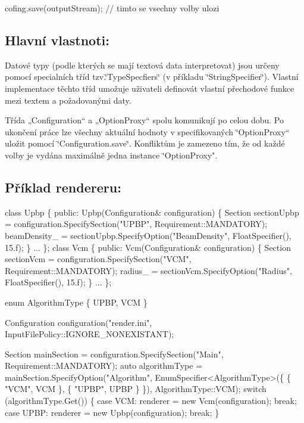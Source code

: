 \begin{DoxyPre}{\ttfamily cofing.save(outputStream); // timto se vsechny volby ulozi
}\end{DoxyPre}
 



\subsection*{Hlavní vlastnoti\+:}

Datové typy (podle kterých se mají textová data interpretovat) jsou určeny pomocí specialních tříd tzv.\char`\"{}\+Type\+Specfiers\char`\"{} (v příkladu \char`\"{}\+String\+Specifier\char`\"{}). Vlastní implementace těchto tříd umožuje uživateli definovát vlastní přechodové funkce mezi textem a požadovanými daty.

Třída „\+Configuration“ a „\+Option\+Proxy“ spolu komunikují po celou dobu. Po ukončení práce lze všechny aktuální hodnoty v specifikovaných \char`\"{}\+Option\+Proxy“ uložit pomocí \char`\"{}Configuration.\+save\char`\"{}. Konfliktům je zamezeno
tím, že od každé volby je vydána maximálně jedna instance \char`\"{}Option\+Proxy".

\subsection*{Příklad rendereru\+:}






\begin{DoxyPre}{\ttfamily 
class Upbp
\{
public:
    Upbp(Configuration& configuration)  
    \{
        Section sectionUpbp = configuration.SpecifySection("UPBP", Requirement::MANDATORY);
        beamDensity\_ = sectionUpbp.SpecifyOption("BeamDensity", FloatSpecifier(), 15.f);
    \}
    ...
\};
class Vcm
\{
public:
    Vcm(Configuration& configuration)
    \{
        Section sectionVcm = configuration.SpecifySection("VCM", Requirement::MANDATORY);
        radius\_ = sectionVcm.SpecifyOption("Radius", FloatSpecifier(), 15.f);
    \}
    ... 
\};}\end{DoxyPre}



\begin{DoxyPre}{\ttfamily enum AlgorithmType
\{
    UPBP,
    VCM
\}}\end{DoxyPre}



\begin{DoxyPre}{\ttfamily Configuration configuration("render.ini", InputFilePolicy::IGNORE\_NONEXISTANT);}\end{DoxyPre}



\begin{DoxyPre}{\ttfamily Section mainSection = configuration.SpecifySection("Main", Requirement::MANDATORY);
auto algorithmType = mainSection.SpecifyOption("Algorithm", EnumSpecifier<AlgorithmType>(\{ \{ "VCM", VCM \}, \{ "UPBP", UPBP \} \}), AlgorithmType::VCM);
switch (algorithmType.Get())
\{
    case VCM: renderer = new Vcm(configuration); break;
    case UPBP: renderer = new Upbp(configuration); break;
\}
}\end{DoxyPre}
 
